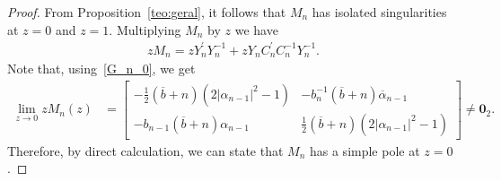 \documentclass[12pt]{amsart}
\begin{document}
\begin{proof} 
From Proposition~\ref{teo:geral}, it follows that \( M_n \) has isolated singularities at \( z=0 \) and \( z=1 \). 
Multiplying \( M_n \) by \( z \) we have
\begin{align*}
zM_n=zY_n^\prime Y_n^{-1}+zY_nC^\prime_n C^{-1}_n Y_n^{-1}.
\end{align*}
Note that, using~\eqref{G_n_0}, we get
\begin{align*}
 \lim_{z \to 0}zM_n(z)
 & =
 \begin{bmatrix}
-\frac{1}{2}(\overline{b}+n)(2|\alpha_{n-1}|^2-1) & -b_n^{-1}(\overline{b}+n)\overline{\alpha}_{n-1} \\
 -b_{n-1}(\overline{b}+n)\alpha_{n-1} & \frac{1}{2}(\overline{b}+n)(2|\alpha_{n-1}|^2-1)
\end{bmatrix}
 \neq \mathbf{0}_{2} .
\end{align*}
Therefore, by direct calculation, we can state that \( M_n \) has a simple pole at \( z=0 \). 



\end{proof}
\end{document}
